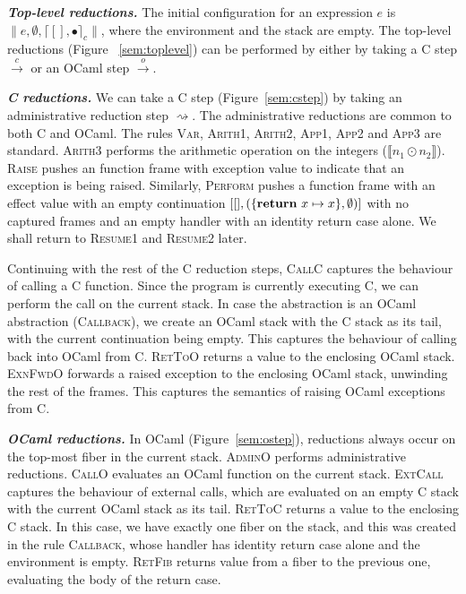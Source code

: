 \documentclass[sigplan,10pt,review,anonymous]{acmart}\settopmatter{printfolios=true,printccs=false,printacmref=false}
\newcommand{\kw}[1]{\text{\bf #1}}
\newcommand{\caseval}[2]{\kw{return}~#1 \mapsto #2}
\newcommand{\cstacka}[2]{\big \lceil #1, #2 \big \rceil_c} %
\newcommand{\configa}[3]{\|#1,#2,#3\|}
\newcommand{\ostep}{\xrightarrow{o}}
\newcommand{\cstep}{\xrightarrow{c}}
\begin{document}
\textbf{\textit{Top-level reductions.}} The initial configuration for an expression
$e$ is $\configa{e}{\emptyset}{\cstacka{[]}{\bullet}}$, where the environment
and the stack are empty. The top-level reductions (Figure ~\ref{sem:toplevel})
can be performed by either by taking a C step $\cstep$ or an OCaml step
$\ostep$.

\textbf{\textit{C reductions.}} We can take a C step (Figure~\ref{sem:cstep}) by
taking an administrative reduction step $\rightsquigarrow$. The administrative
reductions are common to both C and OCaml. The rules \textsc{Var},
\textsc{Arith1}, \textsc{Arith2}, \textsc{App1}, \textsc{App2} and
\textsc{App3} are standard. \textsc{Arith3} performs the arithmetic operation
on the integers ($\llbracket n_1 \odot n_2 \rrbracket$). \textsc{Raise} pushes
an function frame with exception value to indicate that an exception is being
raised. Similarly, \textsc{Perform} pushes a function frame with an effect
value with an empty continuation $[[],(\{\caseval{x}{x}\},\emptyset)]$ with no
captured frames and an empty handler with an identity return case alone. We
shall return to \textsc{Resume1} and \textsc{Resume2} later.

Continuing with the rest of the C reduction steps, \textsc{CallC} captures the
behaviour of calling a C function. Since the program is currently executing C,
we can perform the call on the current stack. In case the abstraction is an
OCaml abstraction (\textsc{Callback}), we create an OCaml stack with the C
stack as its tail, with the current continuation being empty. This captures the
behaviour of calling back into OCaml from C. \textsc{RetToO} returns a value to
the enclosing OCaml stack. \textsc{ExnFwdO} forwards a raised exception to the
enclosing OCaml stack, unwinding the rest of the frames. This captures the
semantics of raising OCaml exceptions from C.

\textbf{\textit{OCaml reductions.}} In OCaml (Figure~\ref{sem:ostep}),
reductions always occur on the top-most fiber in the current stack.
\textsc{AdminO} performs administrative reductions. \textsc{CallO} evaluates an
OCaml function on the current stack. \textsc{ExtCall} captures the behaviour of
external calls, which are evaluated on an empty C stack with the current OCaml
stack as its tail. \textsc{RetToC} returns a value to the enclosing C stack. In
this case, we have exactly one fiber on the stack, and this was created in the
rule \textsc{Callback}, whose handler has identity return case alone and the
environment is empty. \textsc{RetFib} returns value from a fiber to the
previous one, evaluating the body of the return case.
\end{document}
